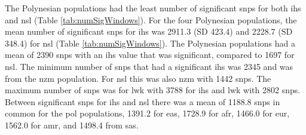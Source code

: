 \documentclass[]{report}
\begin{document}
The Polynesian populations had the least number of significant
\glspl{snp} for both \gls{ihs} and \gls{nsl} (Table
\ref{tab:numSigWindows}). For the four Polynesian populations, the mean
number of significant \glspl{snp} for \gls{ihs} was 2911.3 (SD 423.4)
and 2228.7 (SD 348.4) for \gls{nsl} (Table \ref{tab:numSigWindows}). The
Polynesian populations had a mean of 2390 \glspl{snp} with an \gls{ihs}
value that was significant, compared to 1697 for \gls{nsl}. The minimum
number of \glspl{snp} that had a significant \gls{ihs} was 2345 and was
from the \gls{nzm} population. For \gls{nsl} this was also \gls{nzm}
with 1442 \glspl{snp}. The maximum number of \glspl{snp} was for
\gls{lwk} with 3788 for \gls{ihs} and \gls{lwk} with 2802 \glspl{snp}.
Between significant \glspl{snp} for \gls{ihs} and \gls{nsl} there was a
mean of 1188.8 \glspl{snp} in common for the \gls{pol} populations,
1391.2 for \gls{eas}, 1728.9 for \gls{afr}, 1466.0 for \gls{eur}, 1562.0
for \gls{amr}, and 1498.4 from \gls{sas}.
\end{document}
